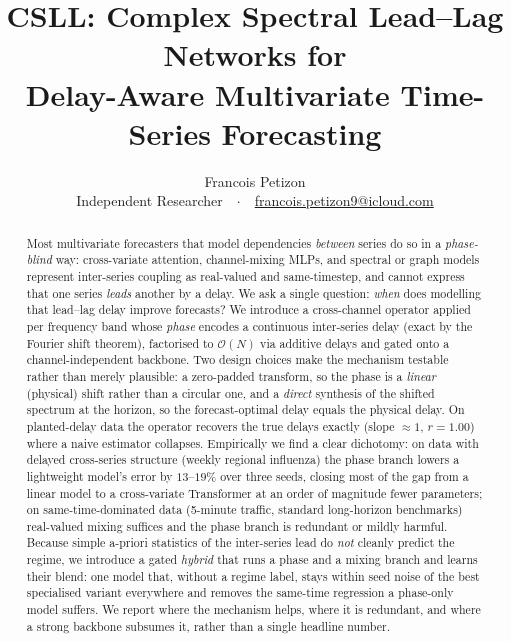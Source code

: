 \documentclass[journal,a4paper]{IEEEtran}
\begin{document}
\title{CSLL: Complex Spectral Lead--Lag Networks for\\
Delay-Aware Multivariate Time-Series Forecasting}

\author{Francois Petizon\\[2pt]
{\normalsize Independent Researcher\ \ $\cdot$\ \ \href{mailto:francois.petizon9@icloud.com}{francois.petizon9@icloud.com}}}


\maketitle

\begin{abstract}
Most multivariate forecasters that model dependencies \emph{between} series do so in a
\emph{phase-blind} way: cross-variate attention, channel-mixing MLPs, and spectral or graph
models represent inter-series coupling as real-valued and same-timestep, and cannot express that
one series \emph{leads} another by a delay. We ask a single question: \emph{when} does modelling
that lead--lag delay improve forecasts? We introduce a cross-channel operator applied per
frequency band whose \emph{phase} encodes a continuous inter-series delay (exact by the Fourier
shift theorem), factorised to $\mathcal{O}(N)$ via additive delays and gated onto a
channel-independent backbone. Two design choices make the mechanism testable rather than merely
plausible: a zero-padded transform, so the phase is a \emph{linear} (physical) shift rather than a
circular one, and a \emph{direct} synthesis of the shifted spectrum at the horizon, so the
forecast-optimal delay equals the physical delay. On planted-delay data the operator recovers the
true delays exactly (slope ${\approx}1$, $r{=}1.00$) where a naive estimator collapses.
Empirically we find a clear dichotomy: on data with delayed cross-series structure (weekly
regional influenza) the phase branch lowers a lightweight model's error by $13$--$19\%$ over
three seeds, closing most of the gap from a linear model to a cross-variate Transformer at an
order of magnitude fewer parameters; on same-time-dominated data (5-minute traffic, standard
long-horizon benchmarks) real-valued mixing suffices and the phase branch is redundant or mildly
harmful. Because simple a-priori statistics of the inter-series lead do \emph{not} cleanly predict
the regime, we introduce a gated \emph{hybrid} that runs a phase and a mixing branch and learns
their blend: one model that, without a regime label, stays within seed noise of the best
specialised variant everywhere and removes the same-time regression a phase-only model suffers. We
report where the mechanism helps, where it is redundant, and where a strong backbone subsumes it,
rather than a single headline number.
\end{abstract}
\end{document}
